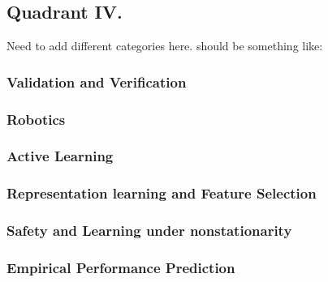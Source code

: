 \subsection{Quadrant IV.}
Need to add different categories here. should be something like:
\subsubsection{Validation and Verification}
\subsubsection{Robotics}
\subsubsection{Active Learning}
\subsubsection{Representation learning and Feature Selection}
\subsubsection{Safety and Learning under nonstationarity}
\subsubsection{Empirical Performance Prediction}